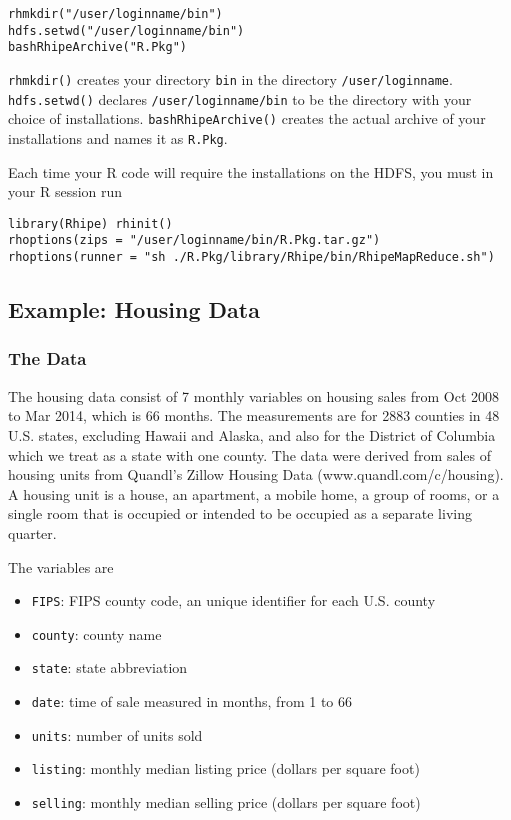 \begin{verbatim}
rhmkdir("/user/loginname/bin")
hdfs.setwd("/user/loginname/bin")
bashRhipeArchive("R.Pkg")
\end{verbatim}

\texttt{rhmkdir()} creates your directory \texttt{bin} in the directory \texttt{/user/loginname}.
\texttt{hdfs.setwd()} declares \texttt{/user/loginname/bin} to be the directory with your
choice of installations.  \texttt{bashRhipeArchive()} creates the actual archive of
your installations and names it as \texttt{R.Pkg}.

Each time your R code will require the installations on the HDFS, you
must in your R session run

\begin{verbatim}
library(Rhipe) rhinit()
rhoptions(zips = "/user/loginname/bin/R.Pkg.tar.gz")
rhoptions(runner = "sh ./R.Pkg/library/Rhipe/bin/RhipeMapReduce.sh")
\end{verbatim}


\subsection{Example: Housing Data}
\subsubsection{The Data}

The housing data consist of 7 monthly variables on housing sales from Oct
2008 to Mar 2014, which is 66 months. The measurements are for 2883 counties
in 48 U.S. states, excluding Hawaii and Alaska, and also for the District of
Columbia which we treat as a state with one county.
The data were derived from sales of housing units from Quandl's Zillow Housing
Data (www.quandl.com/c/housing).
A housing unit is a house, an apartment, a mobile home, a group of rooms, or a
single room that is occupied or intended to be occupied  as a
separate living quarter.

The variables are
\begin{itemize}
\item \verb|FIPS|: FIPS county code, an unique identifier for each U.S. county
\item \verb|county|: county name
\item \verb|state|: state abbreviation
\item \verb|date|: time of sale measured in months, from 1 to 66
\item \verb|units|: number of units sold
\item \verb|listing|: monthly median listing price (dollars per square foot)
\item \verb|selling|: monthly median selling price (dollars per square foot)
\end{itemize}

